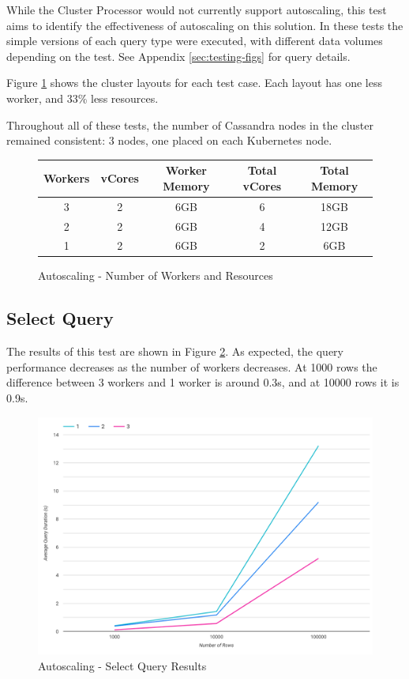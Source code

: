 While the Cluster Processor would not currently support autoscaling, this test aims to identify the effectiveness of autoscaling on this solution. In these tests the simple versions of each query type were executed, with different data volumes depending on the test. See Appendix \ref{sec:testing-figs} for query details. 

Figure \ref{fig:autoscale-test-workers} shows the cluster layouts for each test case. Each layout has one less worker, and 33\% less resources.

Throughout all of these tests, the number of Cassandra nodes in the cluster remained consistent: 3 nodes, one placed on each Kubernetes node.

\begin{figure}[ht]
	\centering
	\begin{tabular}{| c | c | c | c | c |}
		\hline
		\textbf{Workers} & \textbf{vCores} & \textbf{Worker Memory} & \textbf{Total vCores} & \textbf{Total Memory} \\ \hline
		3 & 2 & 6GB & 6 & 18GB \\ \hline
		2 & 2 & 6GB & 4 & 12GB \\ \hline
		1 & 2 & 6GB & 2 & 6GB \\ \hline
	\end{tabular}
	\caption{Autoscaling - Number of Workers and Resources}
	\label{fig:autoscale-test-workers}
\end{figure}

\subsection{Select Query}
The results of this test are shown in Figure \ref{fig:select-simple-autoscale-test}. As expected, the query performance decreases as the number of workers decreases. At 1000 rows the difference between 3 workers and 1 worker is around 0.3s, and at 10000 rows it is 0.9s.

\begin{figure}[ht]
	\centering
	\includegraphics[width=0.7\linewidth]{chapters/diagrams/testing/select-simple-autoscale-test}
	\caption{Autoscaling - Select Query Results}
	\label{fig:select-simple-autoscale-test}
\end{figure}

